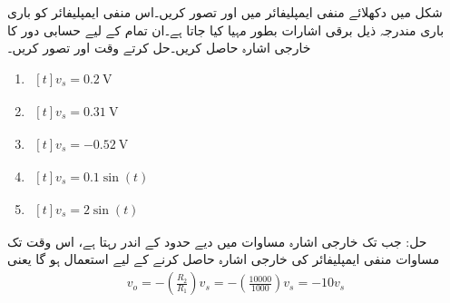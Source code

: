 شکل  میں دکھلائے منفی ایمپلیفائر میں  اور  تصور کریں۔اس منفی ایمپلیفائر کو باری باری مندرجہ ذیل برقی اشارات بطور  مہیا کیا جاتا ہے۔ان تمام کے لیے حسابی دور کا خارجی اشارہ  حاصل کریں۔حل کرتے وقت  اور  تصور کریں۔
\begin{enumerate}
\item $\begin{aligned}[t]
v_s = \SI{0.2}{\volt}
\end{aligned}$
\item $\begin{aligned}[t]
v_s = \SI{0.31}{\volt}
\end{aligned}$

\item $\begin{aligned}[t]
v_s = \SI{-0.52}{\volt}
\end{aligned}$

\item $\begin{aligned}[t]
v_s = 0.1 \sin \left (t \right )
\end{aligned}$

\item $\begin{aligned}[t]
v_s = 2 \sin \left ( t \right )
\end{aligned}$
\end{enumerate}
حل:	جب تک خارجی اشارہ  مساوات   میں دیے حدود کے اندر رہتا ہے، اس وقت تک مساوات   منفی ایمپلیفائر کی خارجی اشارہ  حاصل کرنے کے لیے استعمال ہو گا یعنی
\begin{align*}
v_o = - \left ( \frac{R_2}{R_1} \right ) v_s = -\left ( \frac{10000}{1000} \right ) v_s=-10 v_s
\end{align*}
%
